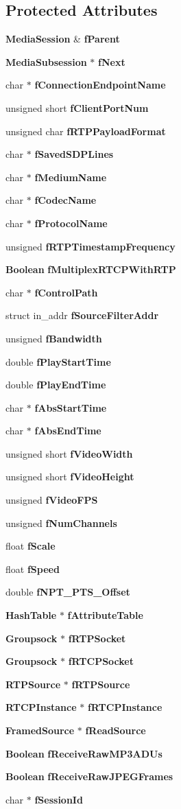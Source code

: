 \subsection*{Protected Attributes}
\begin{DoxyCompactItemize}
\item 
{\bf Media\+Session} \& {\bf f\+Parent}
\item 
{\bf Media\+Subsession} $\ast$ {\bf f\+Next}
\item 
char $\ast$ {\bf f\+Connection\+Endpoint\+Name}
\item 
unsigned short {\bf f\+Client\+Port\+Num}
\item 
unsigned char {\bf f\+R\+T\+P\+Payload\+Format}
\item 
char $\ast$ {\bf f\+Saved\+S\+D\+P\+Lines}
\item 
char $\ast$ {\bf f\+Medium\+Name}
\item 
char $\ast$ {\bf f\+Codec\+Name}
\item 
char $\ast$ {\bf f\+Protocol\+Name}
\item 
unsigned {\bf f\+R\+T\+P\+Timestamp\+Frequency}
\item 
{\bf Boolean} {\bf f\+Multiplex\+R\+T\+C\+P\+With\+R\+T\+P}
\item 
char $\ast$ {\bf f\+Control\+Path}
\item 
struct in\+\_\+addr {\bf f\+Source\+Filter\+Addr}
\item 
unsigned {\bf f\+Bandwidth}
\item 
double {\bf f\+Play\+Start\+Time}
\item 
double {\bf f\+Play\+End\+Time}
\item 
char $\ast$ {\bf f\+Abs\+Start\+Time}
\item 
char $\ast$ {\bf f\+Abs\+End\+Time}
\item 
unsigned short {\bf f\+Video\+Width}
\item 
unsigned short {\bf f\+Video\+Height}
\item 
unsigned {\bf f\+Video\+F\+P\+S}
\item 
unsigned {\bf f\+Num\+Channels}
\item 
float {\bf f\+Scale}
\item 
float {\bf f\+Speed}
\item 
double {\bf f\+N\+P\+T\+\_\+\+P\+T\+S\+\_\+\+Offset}
\item 
{\bf Hash\+Table} $\ast$ {\bf f\+Attribute\+Table}
\item 
{\bf Groupsock} $\ast$ {\bf f\+R\+T\+P\+Socket}
\item 
{\bf Groupsock} $\ast$ {\bf f\+R\+T\+C\+P\+Socket}
\item 
{\bf R\+T\+P\+Source} $\ast$ {\bf f\+R\+T\+P\+Source}
\item 
{\bf R\+T\+C\+P\+Instance} $\ast$ {\bf f\+R\+T\+C\+P\+Instance}
\item 
{\bf Framed\+Source} $\ast$ {\bf f\+Read\+Source}
\item 
{\bf Boolean} {\bf f\+Receive\+Raw\+M\+P3\+A\+D\+Us}
\item 
{\bf Boolean} {\bf f\+Receive\+Raw\+J\+P\+E\+G\+Frames}
\item 
char $\ast$ {\bf f\+Session\+Id}
\end{DoxyCompactItemize}
